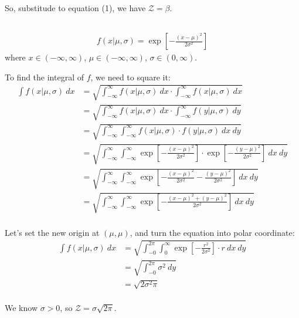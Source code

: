 So, substitude to equation (1), we have $\mathcal{Z} = \beta$.

\subsection{}
\begin{align*}
    f(x|\mu,\sigma)=\exp[-\frac{(x-\mu)^2}{2\sigma^2}]
\end{align*}
where $x \in (-\infty, \infty)$, $\mu \in (-\infty, \infty)$, $\sigma \in (0, \infty)$.

To find the integral of $f$, we need to square it:
\begin{align*}
    \int f(x|\mu, \sigma) \ dx &= \sqrt{\int_{-\infty}^{\infty} f(x|\mu, \sigma) \ dx \cdot \int_{-\infty}^{\infty} f(x|\mu, \sigma) \ dx} \\
    &= \sqrt{\int_{-\infty}^{\infty} f(x|\mu, \sigma) \ dx \cdot \int_{-\infty}^{\infty} f(y|\mu, \sigma) \ dy} \\
    &= \sqrt{\int_{-\infty}^{\infty} \int_{-\infty}^{\infty} f(x|\mu, \sigma) \cdot f(y|\mu, \sigma) \ dx\ dy} \\
    &= \sqrt{\int_{-\infty}^{\infty} \int_{-\infty}^{\infty} \exp[-\frac{(x-\mu)^2}{2\sigma^2}] \cdot \exp[-\frac{(y-\mu)^2}{2\sigma^2}] \ dx\ dy} \\
    &= \sqrt{\int_{-\infty}^{\infty} \int_{-\infty}^{\infty} \exp[-\frac{(x-\mu)^2}{2\sigma^2}-\frac{(y-\mu)^2}{2\sigma^2}] \ dx\ dy} \\
    &= \sqrt{\int_{-\infty}^{\infty} \int_{-\infty}^{\infty} \exp[-\frac{(x-\mu)^2 + (y-\mu)^2}{2\sigma^2}] \ dx\ dy} \\
\end{align*}

Let's set the new origin at $(\mu, \mu)$, and turn the equation into polar coordinate:
\begin{align*}
    \int f(x|\mu, \sigma) \ dx
    &= \sqrt{\int_{-0}^{2 \pi} \int_{0}^{\infty} \exp[-\frac{r^2}{2\sigma^2}] \cdot r \ dx\ dy} \\
    &= \sqrt{\int_{-0}^{2 \pi} \sigma^2 \ dy} \\
    &= \sqrt{2 \sigma^2 \pi } \\
\end{align*}

We know $\sigma > 0$, so $\mathcal{Z} = \sigma \sqrt{2 \pi}$.

